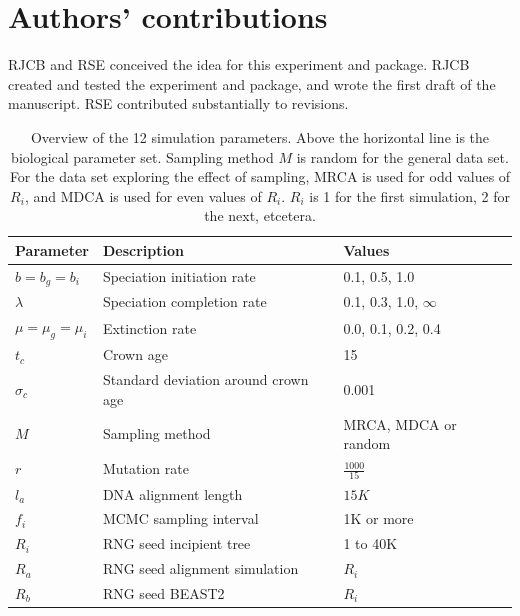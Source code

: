 \documentclass{article}
\begin{document}
\section{Authors' contributions}

RJCB and RSE conceived the idea for this experiment and package. 
RJCB created and tested the experiment and package, 
and wrote the first draft of the manuscript. 
RSE contributed substantially to revisions.




\appendix

\begin{table}
  \centering 
  \begin{tabular}{l l l}
    \hline
    Parameter             & Description & Values \\
    \hline
    \hline
    $b = b_g = b_i$       & Speciation initiation rate & 0.1, 0.5, 1.0 \\
    $\lambda$             & Speciation completion rate & 0.1, 0.3, 1.0, $\infty$ \\
    $\mu = \mu_g = \mu_i$ & Extinction rate & 0.0, 0.1, 0.2, 0.4 \\
    \hline
    $t_c$                 & Crown age & 15 \\
    $\sigma_c$            & Standard deviation around crown age & 0.001 \\
    $M$                   & Sampling method & MRCA, MDCA or random \\
    $r$                   & Mutation rate & $\frac{1000}{15}$ \\
    $l_a$                 & DNA alignment length & $15K$ \\
    $f_i$                 & MCMC sampling interval & 1K or more \\
    $R_i$                 & RNG seed incipient tree & 1 to 40K \\
    $R_a$                 & RNG seed alignment simulation & $R_i$ \\
    $R_b$                 & RNG seed BEAST2 & $R_i$ \\
    \hline
  \end{tabular}
  \caption{
    Overview of the 12 simulation parameters. Above the horizontal line is 
    the biological parameter set. Sampling method $M$ is random for the general
    data set. For the data set exploring the effect of sampling, MRCA is
    used for odd values of $R_i$, and MDCA is used for even values of $R_i$.
    $R_i$ is 1 for the first simulation, 2 for the next, etcetera.
  }
  \label{table:parameters}
\end{table}
\end{document}
